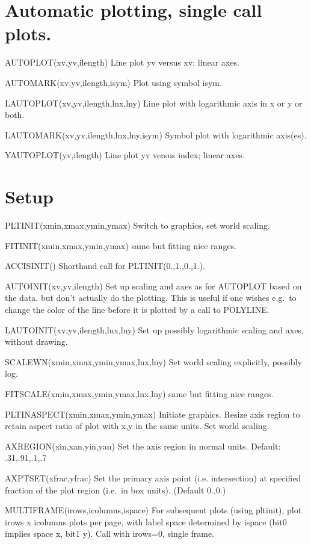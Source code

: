 \documentclass[12pt]{article}
\newif \iftth
\begin{document}
\section{Automatic plotting, single call plots.}

\iftth \special{html:<a href="plottest.f"><img align="right" src="plainplot.png"></a>}\fi
AUTOPLOT(xv,yv,ilength) Line plot yv versus xv; linear axes.

AUTOMARK(xv,yv,ilength,isym) Plot using symbol isym.

LAUTOPLOT(xv,yv,ilength,lnx,lny) Line plot with logarithmic axis in x
or y or both.

LAUTOMARK(xv,yv,ilength,lnx,lny,isym) Symbol plot with logarithmic axis(es).
 
YAUTOPLOT(yv,ilength) Line plot yv versus index; linear axes.


\section{Setup}

PLTINIT(xmin,xmax,ymin,ymax) Switch to graphics, set world scaling.

FITINIT(xmin,xmax,ymin,ymax) same but fitting nice ranges.

ACCISINIT() Shorthand call for PLTINIT(0.,1.,0.,1.).

AUTOINIT(xv,yv,ilength) Set up scaling and axes as for AUTOPLOT based
on the data, but don't actually do the plotting. This is useful if one
wishes e.g.\  to change the color of the line before it is plotted by
a call to POLYLINE.

LAUTOINIT(xv,yv,ilength,lnx,lny) Set up possibly logarithmic scaling
and axes, without drawing.

SCALEWN(xmin,xmax,ymin,ymax,lnx,lny) Set world scaling explicitly, possibly log.

FITSCALE(xmin,xmax,ymin,ymax,lnx,lny) same but fitting nice ranges.

PLTINASPECT(xmin,xmax,ymin,ymax) Initiate graphics. Resize axis region
to retain aspect ratio of plot with x,y in the same units. Set world scaling.

AXREGION(xin,xan,yin,yan) Set the axis region in normal units.
Default: .31,.91,.1,.7

AXPTSET(xfrac,yfrac) Set the primary axis point (i.e. intersection) at specified
fraction of the plot region (i.e.\ in box units). (Default 0.,0.)

MULTIFRAME(irows,icolumns,ispace) For subsequent plots (using pltinit),
plot irows x icolumns plots per page, with label space determined by
ispace (bit0 implies space x, bit1 y). Call with irows=0, single frame.
\end{document}
